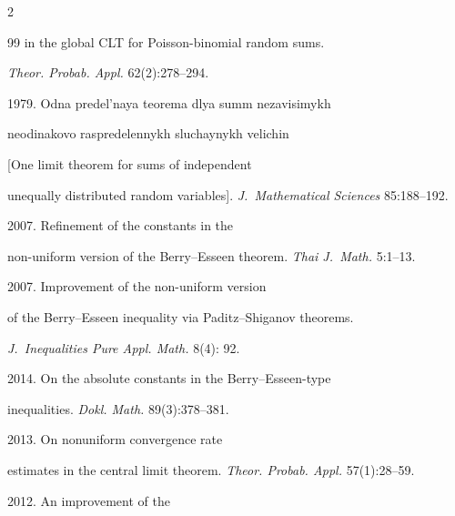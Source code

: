 \begin{multicols}{2}
{{\begin{thebibliography}{99}
in the global CLT for Poisson-binomial random sums. 


\textit{Theor. Probab. Appl.} 62(2):278--294.







 1979. Odna predel'naya teorema dlya summ nezavisimykh


neodinakovo raspredelennykh sluchaynykh velichin 


[One limit theorem for sums of independent


unequally distributed random variables]. \textit{J.~Mathematical Sciences} 85:188--192.







 2007. Refinement of the constants in the


non-uniform version of the Berry--Esseen theorem. \textit{Thai J.~Math.} 5:1--13.







 2007. Improvement of the non-uniform version


of the Berry--Esseen inequality via Paditz--Shiganov theorems.


\textit{J.~Inequalities  Pure  Appl. Math.} 8(4): 92.







 2014. On the absolute constants in the Berry--Esseen-type


inequalities. \textit{Dokl. Math.} 89(3):378--381.







 2013. On nonuniform convergence rate


estimates in the central limit theorem. \textit{Theor. Probab. Appl.} 57(1):28--59.







 2012. An improvement of the



\end{thebibliography}}}
\end{multicols}
